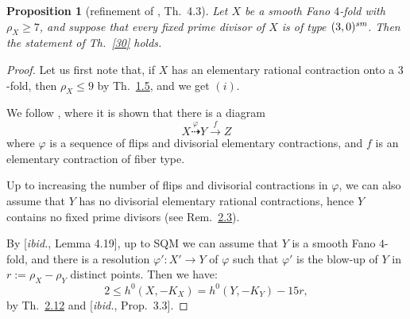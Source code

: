 \documentclass[10pt,a4paper]{amsart}
\newtheorem{proposition}[thm]{Proposition}
\theoremstyle{definition}
\numberwithin{figure}{section}
\numberwithin{table}{section}
\newcommand{\ph}{\varphi}
\newcommand{\la}{\longrightarrow}
\newcommand{\sm}{\text{\it sm}}
\begin{document}
\begin{proposition}[refinement of \cite{blowup}, Th.~4.3]\label{all30}
  Let $X$ be a smooth Fano $4$-fold with $\rho_X\geq 7$, and suppose that every fixed prime divisor of $X$ is of type $(3,0)^{\sm}$. Then the statement of Th.~\ref{30} holds.
  \end{proposition}

  \begin{proof}
    Let us first note that, if $X$ has an elementary rational contraction onto a $3$-fold, then $\rho_X\leq 9$ by Th.~\href{https://arxiv.org/abs/2508.21207v1}{1.5}, and we get $(i)$.

    We follow  \cite[proof of Lemma 4.22]{blowup}, where it is shown that there is a diagram
    $$X\stackrel{\ph}{\dasharrow} Y\stackrel{f}{\la} Z$$
    where $\ph$ is a sequence of flips and divisorial elementary  contractions, and $f$ is an elementary contraction of fiber type.

    Up to increasing the number of flips and divisorial contractions in $\ph$, we can also assume that $Y$ has no divisorial elementary  rational contractions, hence $Y$ contains no fixed prime divisors (see Rem.~\href{https://arxiv.org/abs/2508.21207v1}{2.3}). 

    By [\emph{ibid.}, Lemma 4.19], up to SQM we can assume that   $Y$ is a smooth Fano $4$-fold, and  there is a resolution
    $\ph'\colon X'\to Y$
    of $\ph$ such that $\ph'$ 
 is  the blow-up of $Y$ in $r:=\rho_X-\rho_Y$ distinct points. Then we have:
    \begin{equation}\label{sections}
     2\leq h^0(X,-K_X)=h^0(Y,-K_Y)-15r,
   \end{equation}
   by Th.~\href{https://arxiv.org/abs/2508.21207v1}{2.12} and [\emph{ibid.}, Prop.~3.3].


\end{proof}
\end{document}
